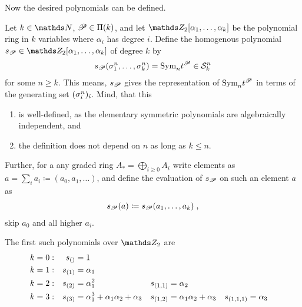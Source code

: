 Now the desired polynomials can be defined.
\begin{Def}
  Let $k\in\Nat$, $\mathscr{P}\in\Pi({k})$, and let
  $\Zmod2[\alpha_1,\dotsc,\alpha_k]$ be the polynomial ring in $k$
  variables where $\alpha_i$ has degree $i$.
  Define the homogenous polynomial
  $\s{\Part}\in\Zmod2[\alpha_1,\dotsc,\alpha_k]$ of degree $k$ by
  \begin{gather*}
    s_{\mathscr{P}}(\sigma_{1}^{n},\dotsc, \sigma_{k}^{n}) = \text{\normalfont Sym}_{n} t^{\mathscr{P}} \in \mathcal{S}^{n}_k
  \end{gather*}
  for some $n\geq k$. This means, $s_{\mathscr{P}}$ gives the representation
  of $\text{\normalfont Sym}_{n}t^{\mathscr{P}}$ in terms of the generating set $(\sigma_{i}^{n})_i$.
  Mind, that this
  \begin{enumerate}
  \item is well-defined, as the elementary symmetric
    polynomials are algebraically independent, and
  \item the definition does not depend on $n$ as long as $k\leq n$.
  \end{enumerate}
  Further, for a any graded ring $A_*=\bigoplus_{i\geq 0} A_i$ write
  elements as $a=\sum_i a_i \coloneqq (a_0,a_1,\dotsc)$, and define
  the evaluation of $s_{\mathscr{P}}$ on such an element $a$ as
  \begin{gather*}
    s_{\mathscr{P}}(a) \coloneqq s_{\mathscr{P}}(a_1,\dotsc,a_k)
    \;,
  \end{gather*}
  \idest skip $a_0$ and all higher $a_i$.
\end{Def}

\begin{Ex}
  The first such polynomials over $\Zmod2$ are
  \begin{align*}
    k&=0:
    &s_{()} &= 1
    \\ k&=1:
    &s_{(1)} &= \alpha_1
    \\ k&=2:
    &s_{(2)} &= \alpha_1^2
        &s_{(1,1)} &= \alpha_2
    \\ k&=3:
    &s_{(3)} &= \alpha_1^3 + \alpha_1\alpha_2 + \alpha_3
        &s_{(1,2)} &= \alpha_1\alpha_2 + \alpha_3
             &s_{(1,1,1)} &= \alpha_3
  \end{align*}
  \cite[p.~90]{milnorlectures}
\end{Ex}

